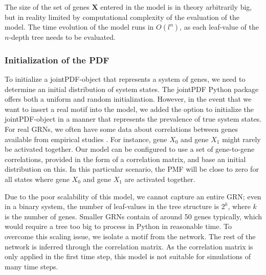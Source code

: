 \documentclass[../main.tex]{subfiles}
\begin{document}
The size of the set of genes $\mathbf{X}$ entered in the model is in theory arbitrarily big, but in reality limited by computational complexity of the evaluation of the model.
The time evolution of the model runs in $O(l^{n})$, as each leaf-value of the $n$-depth tree needs to be evaluated.

\subsubsection{Initialization of the PDF}

To initialize a jointPDF-object that represents a system of genes, we need to determine an initial distribution of system states.
The jointPDF Python package offers both a uniform and random initialization.
However, in the event that we want to insert a real motif into the model, we added the option to initialize the jointPDF-object in a manner that represents the prevalence of true system states.
For real GRNs, we often have some data about correlations between genes available from empirical studies \cite{ideker2001integrated}.
For instance, gene $X_0$ and gene $X_1$ might rarely be activated together.
Our model can be configured to use a set of gene-to-gene correlations, provided in the form of a correlation matrix, and base an initial distribution on this.
In this particular scenario, the PMF will be close to zero for all states where gene $X_0$ and gene $X_1$ are activated together.

Due to the poor scalability of this model, we cannot capture an entire GRN; even in a binary system, the number of leaf-values in the tree structure is $2^k$, where $k$ is the number of genes.
Smaller GRNs contain of around 50 genes typically, which would require a tree too big to process in Python in reasonable time.
To overcome this scaling issue, we isolate a motif from the network.
The rest of the network is inferred through the correlation matrix.
As the correlation matrix is only applied in the first time step, this model is not suitable for simulations of many time steps.
\end{document}
